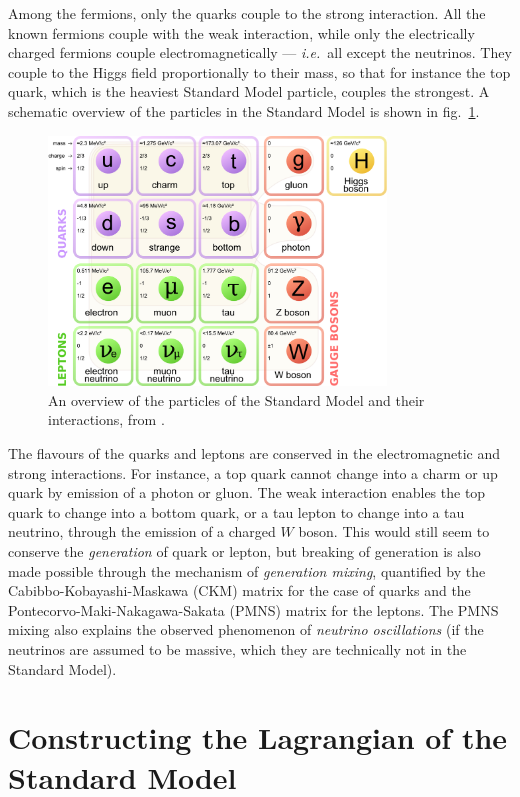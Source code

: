 \documentclass[twoside,english]{uiofysmaster}
\begin{document}
Among the fermions, only the quarks couple to the strong interaction. All the known fermions couple with the weak interaction, while only the electrically charged fermions couple electromagnetically --- {\it i.e.}\ all except the neutrinos. They couple to the Higgs field proportionally to their mass, so that for instance the top quark, which is the heaviest Standard Model particle, couples the strongest. A schematic overview of the particles in the Standard Model is shown in fig.\ \ref{fig:SM_particles}.
\begin{figure}[hbt]
	\centering
	\includegraphics[width=0.8\textwidth]{figures/susyintro/Standard_Model_of_Elementary_Particles.pdf}
	\caption{An overview of the particles of the Standard Model and their interactions, from \cite{Wikimedia_SM_particles}.}
	\label{fig:SM_particles}
\end{figure}

The flavours of the quarks and leptons are conserved in the electromagnetic and strong interactions. For instance, a top quark cannot change into a charm or up quark by emission of a photon or gluon. The weak interaction enables the top quark to change into a bottom quark, or a tau lepton to change into a tau neutrino, through the emission of a charged $W$ boson. This would still seem to conserve the {\it generation} of quark or lepton, but breaking of generation is also made possible through the mechanism of {\it generation mixing}, quantified by the Cabibbo-Kobayashi-Maskawa (CKM) matrix for the case of quarks and the Pontecorvo-Maki-Nakagawa-Sakata (PMNS) matrix for the leptons. The PMNS mixing also explains the observed phenomenon of {\it neutrino oscillations} (if the neutrinos are assumed to be massive, which they are technically not in the Standard Model).

\section{Constructing the Lagrangian of the Standard Model}
\end{document}

